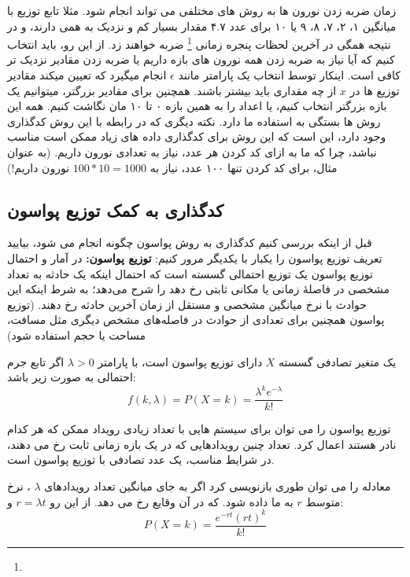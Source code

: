         زمان ضربه زدن نورون ها به روش های مختلفی می تواند انجام شود. مثلا تابع توزیع  با میانگین ۱، ۲، ۷، ۸، ۹ یا ۱۰ برای عدد ۴.۷ مقدار بسیار کم و نزدیک به همی دارند، و در نتیجه همگی در آخرین لحظات پنجره زمانی
        \footnote{}
        ضربه خواهند زد. از این رو، باید انتخاب کنیم که آیا نیاز به ضربه زدن همه نورون های بازه داریم یا ضربه زدن مقادیر نزدیک تر کافی است. اینکار توسط انتخاب یک پارامتر مانند 
        $\epsilon$ 
        انجام میگیرد که تعیین میکند مقادیر توزیع ها در 
        $x$  
        از چه مقداری باید بیشتر باشند.
        همچنین برای مقادیر بزرگتر، میتوانیم یک بازه بزرگتر انتخاب کنیم، یا اعداد را به همین بازه ۰ تا ۱۰ مان نگاشت کنیم. همه این روش ها بستگی به استفاده ما دارد. نکته دیگری که در رابطه با این روش کدگذاری وجود دارد، این است که این روش برای کدگذاری داده های زیاد ممکن است مناسب نباشد، چرا که ما به ازای کد کردن هر عدد، نیاز به تعدادی نورون داریم.
        (به عنوان مثال، برای کد کردن تنها ۱۰۰ عدد، نیاز به 
        $100*10=1000$ نورون داریم!)

    \subsection{کدگذاری به کمک توزیع پواسون}
        قبل از اینکه بررسی کنیم کدگذاری به روش پواسون چگونه انجام می شود، بیایید تعریف توزیع پواسون را یکبار با یکدیگر مرور کنیم:
        \textbf{توزیع پواسون: }
        در آمار و احتمال توزیع پواسون یک توزیع احتمالی گسسته است که احتمال اینکه یک حادثه به تعداد مشخصی در فاصلهٔ زمانی یا مکانی ثابتی رخ دهد را شرح می‌دهد؛ به شرط اینکه این حوادث با نرخ میانگین مشخصی و مستقل از زمان آخرین حادثه رخ دهند. 
        (توزیع پواسون همچنین برای تعدادی از حوادث در فاصله‌های مشخص دیگری مثل مسافت، مساحت یا حجم استفاده شود)\cite{Poisson-Distribution-Wikipedia}

        یک متغیر تصادفی گسسته 
        $X$ 
        دارای توزیع پواسون است، با پارامتر 
        $\lambda > 0$
        اگر تابع جرم احتمالی به صورت زیر باشد:
        \begin{equation}
            f(k, \lambda) = P(X=k) = \frac{\lambda^{k}e^{-\lambda}}{k!}
        \end{equation}

        توزیع پواسون را می توان برای سیستم هایی با تعداد زیادی رویداد ممکن که هر کدام نادر هستند اعمال کرد. تعداد چنین رویدادهایی که در یک بازه زمانی ثابت رخ می دهند، در شرایط مناسب، یک عدد تصادفی با توزیع پواسون است.

        معادله را می توان طوری بازنویسی کرد اگر به جای میانگین تعداد رویدادهای 
        $\lambda$
        ، نرخ متوسط 
        $r$ 
        به ما داده شود. که در آن وقایع رخ می دهد. از این رو 
        $r=\lambda t$
        و:
        \begin{equation}
            P(X=k)=\frac{e^{-rt} {(rt)}^{k}}{k!}
        \end{equation}

